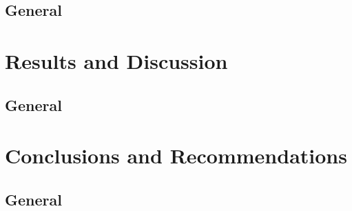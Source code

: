 \documentclass[12pt,a4paper]{report}
\begin{document}
\section{General}

\chapter{Results and Discussion}
\section{General}

\chapter{Conclusions and Recommendations}
\section{General}

\end{document}
